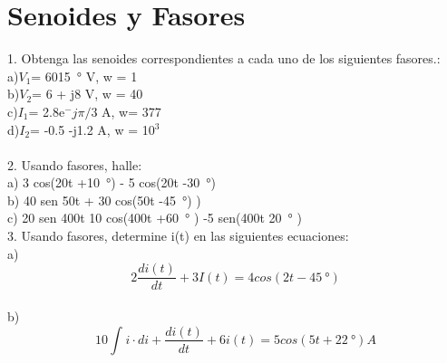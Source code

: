 \documentclass[12pt,letterpaper]{article}
\newcommand{\asection}[2]{
\setcounter{section}{#1}
\addtocounter{section}{-1}
\section{#2}
}
\begin{document}


\asection{13}{Senoides y Fasores}

1. Obtenga las senoides correspondientes a cada uno de los siguientes fasores.:\\
a)$V_1$= 60\angle\SI{15}{\degree} V, w = 1\\
b)$V_2$= 6 + j8 V, w = 40\\
c)$I_1$= 2.8e$^-j\pi/3$ A, w= 377\\
d)$I_2$= -0.5 -j1.2 A, w = 10$^3$\\\\
2. Usando fasores, halle:\\
a) 3 cos(20t +\SI{10}{\degree}) - 5 cos(20t -\SI{30}{\degree})\\
b) 40 sen 50t + 30 cos(50t -\SI{45}{\degree}) )\\
c) 20 sen 400t 10 cos(400t +\SI{60}{\degree} ) -5 sen(400t \SI{20}{\degree} )\\
3. Usando fasores, determine i(t) en las siguientes ecuaciones:\\
a)
            \begin{equation*}
               2\dfrac{di(t)}{dt}+3I(t) = 4 cos(2t -\SI{45}{\degree})
            \end{equation*}\\
b)
\begin{equation}
    10\int_{} i \cdot di+\dfrac{di(t)}{dt} +6i(t)= 5 cos (5t +\SI{22}{\degree})A
\end{equation}\\
\end{document}
